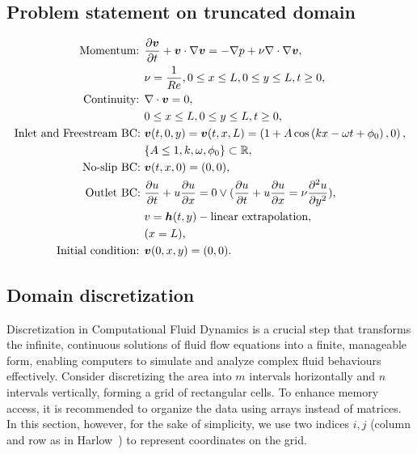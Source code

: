 \documentclass{article}
\begin{document}
\subsection{Problem statement on truncated domain}
\begin{subequations}
\label{eqs:NSE-dsm-bl}
\begin{align}
\label{eqn:momentum}
\text{Momentum: }	&\frac{\partial \boldsymbol{v}}{\partial t} + \boldsymbol{v} \cdot \nabla \boldsymbol{v} = -\nabla p + \nu \nabla \cdot \nabla \boldsymbol{v}, \\ 
					&\nu = \frac{1}{Re},0\leq x \leq L, 0\leq y \leq L, t\geq0,\notag\\
\label{eqn:continuity-dsm-bl}
\text{Continuity: }	& \nabla \cdot \boldsymbol{v} = 0, \\ 
					&0\leq x \leq L, 0\leq y \leq L, t\geq0, \notag\\
\label{eqn:NSE-dsm-bl-bc-freestream}
\text{Inlet and Freestream BC: } 	& \boldsymbol{v}(t,0,y)=\boldsymbol{v}(t,x,L)=\left(1 + A\cos\left( kx -\omega t + \phi_0 \right),0\right),\\
									& \{A\leq 1,k,\omega, \phi_0\}\subset \mathbb{R},\notag\\
\label{eqn:NSE-dsm-bl-bc-noslip}
\text{No-slip BC: } & \boldsymbol{v}(t,x,0)=(0,0), \\
\label{eqn:NSE-dsm-bl-bc-outlet}
\text{Outlet BC: } 	& \frac{\partial u}{\partial t}+u\frac{\partial u}{\partial x}=0\lor(\frac{\partial u}{\partial t}+u\frac{\partial u}{\partial x}=\nu \frac{\partial ^2 u}{\partial y^2}), \\ 
					& v=\boldsymbol{h}(t,y)-\text{linear extrapolation},\notag\\
					& (x=L),\notag\\
\text{Initial condition: } &\boldsymbol{v}(0,x,y)=(0,0).
\end{align}
\end{subequations}

\subsection{Domain discretization}\label{subsec:dsm-domain}
Discretization in Computational Fluid Dynamics is a crucial step that transforms the infinite, continuous solutions of fluid flow equations into a finite, manageable form, enabling computers to simulate and analyze complex fluid behaviours effectively. Consider discretizing the area into $m$ intervals horizontally and $n$ intervals vertically, forming a grid of rectangular cells. To enhance memory access, it is recommended to organize the data using arrays instead of matrices. In this section, however, for the sake of simplicity, we use two indices $i,j$ (column and row as in Harlow~\cite{Harlow:1965}) to represent coordinates on the grid.
\end{document}
